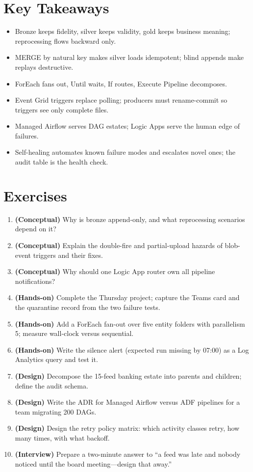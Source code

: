 \section*{Key Takeaways}
\begin{itemize}
    \item Bronze keeps fidelity, silver keeps validity, gold keeps business meaning; reprocessing flows backward only.
    \item MERGE by natural key makes silver loads idempotent; blind appends make replays destructive.
    \item ForEach fans out, Until waits, If routes, Execute Pipeline decomposes.
    \item Event Grid triggers replace polling; producers must rename-commit so triggers see only complete files.
    \item Managed Airflow serves DAG estates; Logic Apps serve the human edge of failures.
    \item Self-healing automates known failure modes and escalates novel ones; the audit table is the health check.
\end{itemize}

\section{Exercises}
\begin{enumerate}
    \item \textbf{(Conceptual)} Why is bronze append-only, and what reprocessing scenarios depend on it?
    \item \textbf{(Conceptual)} Explain the double-fire and partial-upload hazards of blob-event triggers and their fixes.
    \item \textbf{(Conceptual)} Why should one Logic App router own all pipeline notifications?
    \item \textbf{(Hands-on)} Complete the Thursday project; capture the Teams card and the quarantine record from the two failure tests.
    \item \textbf{(Hands-on)} Add a ForEach fan-out over five entity folders with parallelism 5; measure wall-clock versus sequential.
    \item \textbf{(Hands-on)} Write the silence alert (expected run missing by 07:00) as a Log Analytics query and test it.
    \item \textbf{(Design)} Decompose the 15-feed banking estate into parents and children; define the audit schema.
    \item \textbf{(Design)} Write the ADR for Managed Airflow versus ADF pipelines for a team migrating 200 DAGs.
    \item \textbf{(Design)} Design the retry policy matrix: which activity classes retry, how many times, with what backoff.
    \item \textbf{(Interview)} Prepare a two-minute answer to ``a feed was late and nobody noticed until the board meeting---design that away.''
\end{enumerate}

